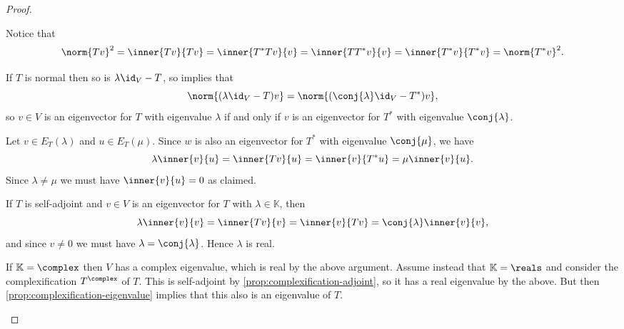 \documentclass[article, a4paper, 11pt, oneside]{memoir}
\numberwithin{equation}{chapter}
\begin{document}
\begin{proof}
\begin{proofsec}
    \item[Proof of \subcref{enum:normal-adjoint-norm}]
    Notice that
    \begin{equation*}
        \norm{Tv}^2
            = \inner{Tv}{Tv}
            = \inner{T^*Tv}{v}
            = \inner{TT^*v}{v}
            = \inner{T^*v}{T^*v}
            = \norm{T^*v}^2.
    \end{equation*}

    \item[Proof of \subcref{enum:normal-adjoint-eigenvalues}]
    If $T$ is normal then so is $\lambda \id_V - T$, so  implies that
    \begin{equation*}
        \norm{(\lambda \id_V - T)v}
            = \norm{(\conj{\lambda} \id_V - T^*)v},
    \end{equation*}
    so $v \in V$ is an eigenvector for $T$ with eigenvalue $\lambda$ if and only if $v$ is an eigenvector for $T^*$ with eigenvalue $\conj{\lambda}$.

    \item[Proof of \subcref{enum:normal-orthogonal-eigenspaces}]
    Let $v \in E_T(\lambda)$ and $u \in E_T(\mu)$. Since $w$ is also an eigenvector for $T^*$ with eigenvalue $\conj{\mu}$, we have
    \begin{equation*}
        \lambda \inner{v}{u}
            = \inner{Tv}{u}
            = \inner{v}{T^*u}
            = \mu \inner{v}{u}.
    \end{equation*}
    Since $\lambda \neq \mu$ we must have $\inner{v}{u} = 0$ as claimed.

    \item[Proof of \subcref{enum:self-adjoint-eigenvalues-exists-and-real}]
    If $T$ is self-adjoint and $v \in V$ is an eigenvector for $T$ with $\lambda \in \mathbb{K}$, then
    \begin{equation*}
        \lambda \inner{v}{v}
            = \inner{Tv}{v}
            = \inner{v}{Tv}
            = \conj{\lambda} \inner{v}{v},
    \end{equation*}
    and since $v \neq 0$ we must have $\lambda = \conj{\lambda}$. Hence $\lambda$ is real.

    If $\mathbb{K} = \complex$ then $V$ has a complex eigenvalue, which is real by the above argument. Assume instead that $\mathbb{K} = \reals$ and consider the complexification $T^\complex$ of $T$. This is self-adjoint by \cref{prop:complexification-adjoint}, so it has a real eigenvalue by the above. But then \cref{prop:complexification-eigenvalue} implies that this also is an eigenvalue of $T$.
    

\end{proofsec}
\end{proof}
\end{document}
